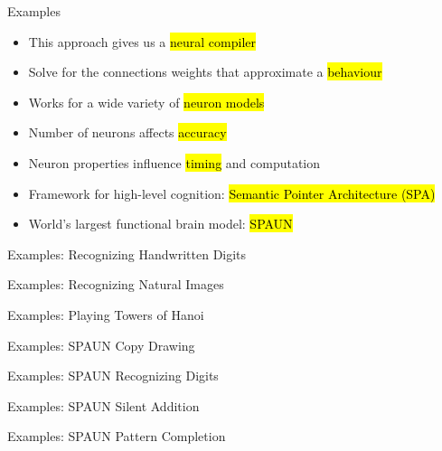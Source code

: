 \documentclass[handout,aspectratio=169]{beamer}
\begin{document}
\begin{frame}{Examples}
	\begin{itemize}
		\setlength\itemsep{0.25cm}
		\item This approach gives us a \hl{neural compiler}
		\item<2-> Solve for the connections weights that approximate a \hl{behaviour}
		\item<3-> Works for a wide variety of \hl{neuron models}
		\item<4-> Number of neurons affects \hl{accuracy}
		\item<5-> Neuron properties influence \hl{timing} and computation
		\item<6-> Framework for high-level cognition: \hl{Semantic Pointer Architecture (SPA)}
		\item<7-> World's largest functional brain model: \hl{SPAUN}
	\end{itemize}
\end{frame}

\begin{frame}{Examples: Recognizing Handwritten Digits}
	\centering
\end{frame}

\begin{frame}{Examples: Recognizing Natural Images}
	\centering
\end{frame}

\begin{frame}{Examples: Playing Towers of Hanoi}
	\centering
\end{frame}

\begin{frame}{Examples: SPAUN Copy Drawing}
	\centering
\end{frame}

\begin{frame}{Examples: SPAUN Recognizing Digits}
	\centering
\end{frame}

\begin{frame}{Examples: SPAUN Silent Addition}
	\centering
\end{frame}

\begin{frame}{Examples: SPAUN Pattern Completion}
	\centering
\end{frame}
\end{document}
